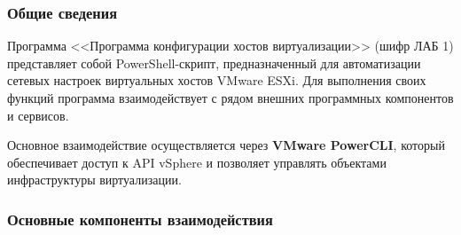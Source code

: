 \subsubsection{Общие сведения}
Программа <<Программа конфигурации хостов виртуализации>> (шифр ЛАБ 1) представляет собой PowerShell-скрипт, предназначенный для автоматизации сетевых настроек виртуальных хостов VMware ESXi. Для выполнения своих функций программа взаимодействует с рядом внешних программных компонентов и сервисов.

Основное взаимодействие осуществляется через \textbf{VMware PowerCLI}, который обеспечивает доступ к API vSphere и позволяет управлять объектами инфраструктуры виртуализации.

\subsubsection{Основные компоненты взаимодействия}

